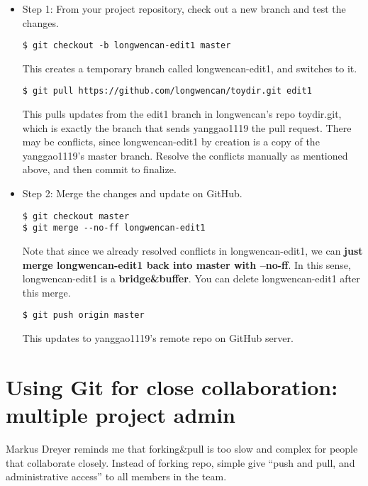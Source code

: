 \documentclass{article} %
\newcommand{\q}[1]{``#1''}
\begin{document}
\begin{itemize}

	\item Step 1: From your project repository, check out a new branch and test the changes.

\begin{lstlisting}
$ git checkout -b longwencan-edit1 master
\end{lstlisting}

This creates a temporary branch called longwencan-edit1, and switches to it.

\begin{lstlisting}
$ git pull https://github.com/longwencan/toydir.git edit1
\end{lstlisting}

This pulls updates from the edit1 branch in longwencan's repo toydir.git, which is exactly the branch that sends yanggao1119 the pull request. There may be conflicts, since longwencan-edit1 by creation is a copy of the yanggao1119's master branch. Resolve the conflicts manually as mentioned above, and then commit to finalize.


	\item Step 2: Merge the changes and update on GitHub.

\begin{lstlisting}
$ git checkout master
$ git merge --no-ff longwencan-edit1
\end{lstlisting}

Note that since we already resolved conflicts in longwencan-edit1, we can \textbf{just merge longwencan-edit1 back into master with --no-ff}. In this sense, longwencan-edit1 is a \textbf{bridge\&buffer}. You can delete longwencan-edit1 after this merge.

\begin{lstlisting}
$ git push origin master
\end{lstlisting}
This updates to yanggao1119's remote repo on GitHub server.

\end{itemize}

\section{Using Git for close collaboration: multiple project admin}

Markus Dreyer reminds me that forking\&pull is too slow and complex for people that collaborate closely. Instead of forking repo, simple give \q{push and pull, and administrative access} to all members in the team. 
\end{document}
